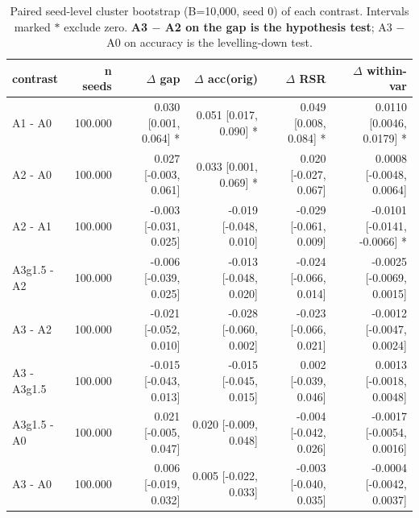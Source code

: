 \begin{table}[t]
\centering
\small
\begin{tabular}{lrrrrr}
\toprule
contrast & n seeds & $\Delta$ gap & $\Delta$ acc(orig) & $\Delta$ RSR & $\Delta$ within-var \\
\midrule
A1 - A0 & 100.000 & 0.030 [0.001, 0.064] * & 0.051 [0.017, 0.090] * & 0.049 [0.008, 0.084] * & 0.0110 [0.0046, 0.0179] * \\
A2 - A0 & 100.000 & 0.027 [-0.003, 0.061] & 0.033 [0.001, 0.069] * & 0.020 [-0.027, 0.067] & 0.0008 [-0.0048, 0.0064] \\
A2 - A1 & 100.000 & -0.003 [-0.031, 0.025] & -0.019 [-0.048, 0.010] & -0.029 [-0.061, 0.009] & -0.0101 [-0.0141, -0.0066] * \\
A3g1.5 - A2 & 100.000 & -0.006 [-0.039, 0.025] & -0.013 [-0.048, 0.020] & -0.024 [-0.066, 0.014] & -0.0025 [-0.0069, 0.0015] \\
A3 - A2 & 100.000 & -0.021 [-0.052, 0.010] & -0.028 [-0.060, 0.002] & -0.023 [-0.066, 0.021] & -0.0012 [-0.0047, 0.0024] \\
A3 - A3g1.5 & 100.000 & -0.015 [-0.043, 0.013] & -0.015 [-0.045, 0.015] & 0.002 [-0.039, 0.046] & 0.0013 [-0.0018, 0.0048] \\
A3g1.5 - A0 & 100.000 & 0.021 [-0.005, 0.047] & 0.020 [-0.009, 0.048] & -0.004 [-0.042, 0.026] & -0.0017 [-0.0054, 0.0016] \\
A3 - A0 & 100.000 & 0.006 [-0.019, 0.032] & 0.005 [-0.022, 0.033] & -0.003 [-0.040, 0.035] & -0.0004 [-0.0042, 0.0037] \\
\bottomrule
\end{tabular}
\caption{Paired seed-level cluster bootstrap (B=10{,}000, seed 0) of each contrast. Intervals marked $*$ exclude zero. \textbf{A3 $-$ A2 on the gap is the hypothesis test}; A3 $-$ A0 on accuracy is the levelling-down test.}
\label{tab:asymob_contrasts}
\end{table}